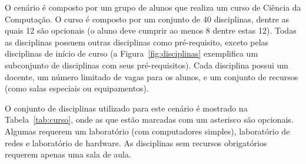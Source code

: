 O cenário é composto por um grupo de alunos que realiza um curso de Ciência da Computação. O curso é composto por um conjunto de 40 disciplinas, dentre as quais 12 são opcionais (o aluno deve cumprir ao menos 8 dentre estas 12). Todas as disciplinas possuem outras disciplinas como pré-requisito, exceto pelas disciplinas de início de curso (a Figura~\ref{fig:disciplinas} exemplifica um subconjunto de disciplinas com seus pré-requisitos). Cada disciplina possui um docente, um número limitado de vagas para os alunos, e um conjunto de recursos (como salas especiais ou equipamentos).

O conjunto de disciplinas utilizado para este cenário é mostrado na Tabela~\ref{tab:curso}, onde as que estão marcadas com um asterisco são opcionais. Algumas requerem um laboratório (com computadores simples), laboratório de redes e laboratório de hardware. As disciplinas sem recursos obrigatórios requerem apenas uma sala de aula.

